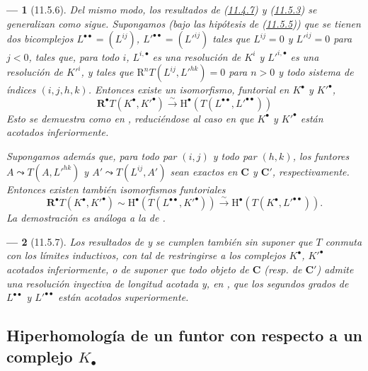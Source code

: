 \documentclass[10pt,oneside,openany]{book}
\theoremstyle{egaenv}\newtheorem*{env}{---}
\theoremstyle{egastatement}
\theoremstyle{egadescription}
\begin{document}
\begin{env}[11.5.6]
\label{0.11.5.6-fr}
Del mismo modo, los resultados de (\hyperref[0.11.4.7-fr]{11.4.7}) y (\hyperref[0.11.5.3-fr]{11.5.3}) se generalizan como sigue. Supongamos (bajo las hipótesis de (\hyperref[0.11.5.5-fr]{11.5.5})) que se tienen dos bicomplejos $L^{\bullet\bullet}=(L^{ij})$, $L'^{\bullet\bullet}=(L'^{ij})$ tales que $L^{ij}=0$ y $L'^{ij}=0$ para $j<0$, tales que, para todo $i$, $L^{i,\bullet}$ es una resolución de $K^i$ y $L'^{i,\bullet}$ es una resolución de $K'^i$, y tales que
$\mathrm R^nT(L^{ij},L'^{hk})=0$
para $n>0$ y todo sistema de índices $(i,j,h,k)$.
Entonces existe un isomorfismo, funtorial en $K^\bullet$ y $K'^\bullet$,
\[
  \label{0.11.5.6.1-fr}
  \mathbf R^\bullet T(K^\bullet,K'^\bullet)\xrightarrow{\sim}
  \mathrm H^\bullet(T(L^{\bullet\bullet},L'^{\bullet\bullet}))
  \tag{11.5.6.1}
\]
Esto se demuestra como en , reduciéndose al caso en que $K^\bullet$ y $K'^\bullet$ están acotados inferiormente.

Supongamos además que, para todo par $(i,j)$ y todo par $(h,k)$, los funtores $A\leadsto T(A,L'^{hk})$ y $A'\leadsto T(L^{ij},A')$ sean exactos en $\boldsymbol{C}$ y $\boldsymbol{C}'$, respectivamente.
Entonces existen también isomorfismos funtoriales
\[
  \label{0.11.5.6.2-fr}
  \mathbf R^\bullet T(K^\bullet,K'^\bullet)
  \sim\mathrm H^\bullet(T(L^{\bullet\bullet},K'^\bullet))
  \xrightarrow{\sim}\mathrm H^\bullet(T(K^\bullet,L'^{\bullet\bullet})).
  \tag{11.5.6.2}
\]
La demostración es análoga a la de .
\end{env}

\begin{env}[11.5.7]
\label{0.11.5.7}
\label{0.11.5.7-fr}
Los resultados de  y  se cumplen también sin suponer que $T$ conmuta con los límites inductivos, con tal de restringirse a los complejos $K^\bullet$, $K'^\bullet$ acotados inferiormente, o de suponer que todo objeto de $\boldsymbol{C}$ (resp. de $\boldsymbol{C}'$) admite una resolución inyectiva de longitud acotada y, en , que los segundos grados de $L^{\bullet\bullet}$ y $L'^{\bullet\bullet}$ están acotados superiormente.
\end{env}

\subsection{Hiperhomología de un funtor con respecto a un complejo $K_\bullet$}
\label{subsection:0.11.6}
\label{subsection:0.11.6-fr}
\end{document}
